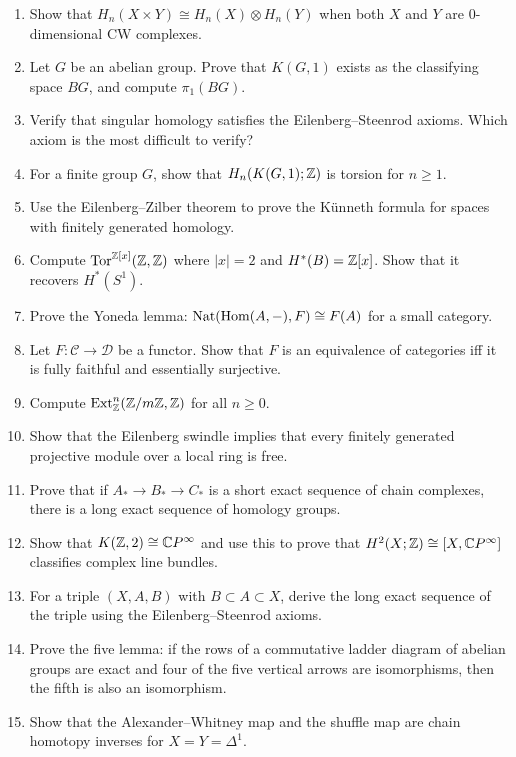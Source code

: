 \begin{enumerate}
    \item [B] Show that $H_n(X \times Y) \cong H_n(X) \otimes H_n(Y)$ when both $X$ and $Y$ are $0$-dimensional CW complexes.
    \item [I] Let $G$ be an abelian group. Prove that $K(G,1)$ exists as the classifying space $BG$, and compute $\pi_1(BG)$.
    \item [I] Verify that singular homology satisfies the Eilenberg--Steenrod axioms. Which axiom is the most difficult to verify?
    \item [I] For a finite group $G$, show that $H_n(K(G,1); \mathbb{Z})$ is torsion for $n \geq 1$.
    \item [A] Use the Eilenberg--Zilber theorem to prove the K\"unneth formula for spaces with finitely generated homology.
    \item [I] Compute $\operatorname{Tor}^{\mathbb{Z}[x]}(\mathbb{Z},\mathbb{Z})$ where $|x| = 2$ and $H^*(B) = \mathbb{Z}[x]$. Show that it recovers $H^*(S^1)$.
    \item [I] Prove the Yoneda lemma: $\operatorname{Nat}(\operatorname{Hom}(A,-), F) \cong F(A)$ for a small category.
    \item [B] Let $F: \mathcal{C} \to \mathcal{D}$ be a functor. Show that $F$ is an equivalence of categories iff it is fully faithful and essentially surjective.
    \item [B] Compute $\operatorname{Ext}_{\mathbb{Z}}^n(\mathbb{Z}/m\mathbb{Z}, \mathbb{Z})$ for all $n \geq 0$.
    \item [I] Show that the Eilenberg swindle implies that every finitely generated projective module over a local ring is free.
    \item [B] Prove that if $A_* \to B_* \to C_*$ is a short exact sequence of chain complexes, there is a long exact sequence of homology groups.
    \item [A] Show that $K(\mathbb{Z},2) \cong \mathbb{C}P^\infty$ and use this to prove that $H^2(X;\mathbb{Z}) \cong [X, \mathbb{C}P^\infty]$ classifies complex line bundles.
    \item [I] For a triple $(X,A,B)$ with $B \subset A \subset X$, derive the long exact sequence of the triple using the Eilenberg--Steenrod axioms.
    \item [B] Prove the five lemma: if the rows of a commutative ladder diagram of abelian groups are exact and four of the five vertical arrows are isomorphisms, then the fifth is also an isomorphism.
    \item [I] Show that the Alexander--Whitney map and the shuffle map are chain homotopy inverses for $X = Y = \Delta^1$.
\end{enumerate}

